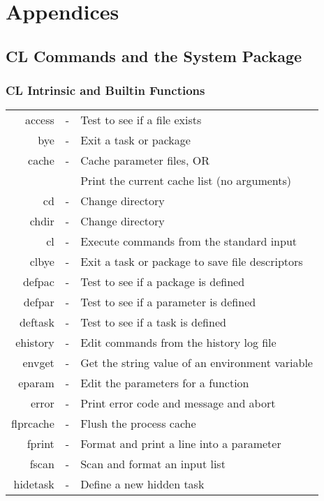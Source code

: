 \newpage
\appendix
\section{Appendices}

\subsection{CL Commands and the System Package}

\subsubsection{CL Intrinsic and Builtin Functions}

\begin{tabular}{rcl}

	 access & - & Test to see if a file exists \\
	    bye & - & Exit a task or package \\
          cache & - & Cache parameter files, OR \\
                  & & Print the current cache list (no arguments)\\
	     cd & - & Change directory \\
	  chdir & - & Change directory \\
	     cl & - & Execute commands from the standard input \\
	  clbye & - & Exit a task or package to save file descriptors \\
	 defpac & - & Test to see if a package is defined \\
	 defpar & - & Test to see if a parameter is defined \\
        deftask & - & Test to see if a task is defined \\
       ehistory & - & Edit commands from the history log file \\
	 envget & - & Get the string value of an environment variable \\
         eparam & - & Edit the parameters for a function \\
	  error & - & Print error code and message and abort \\
      flprcache & - & Flush the process cache \\
	 fprint & - & Format and print a line into a parameter \\
	  fscan & - & Scan and format an input list \\
       hidetask & - & Define a new hidden task \\

\end{tabular}
